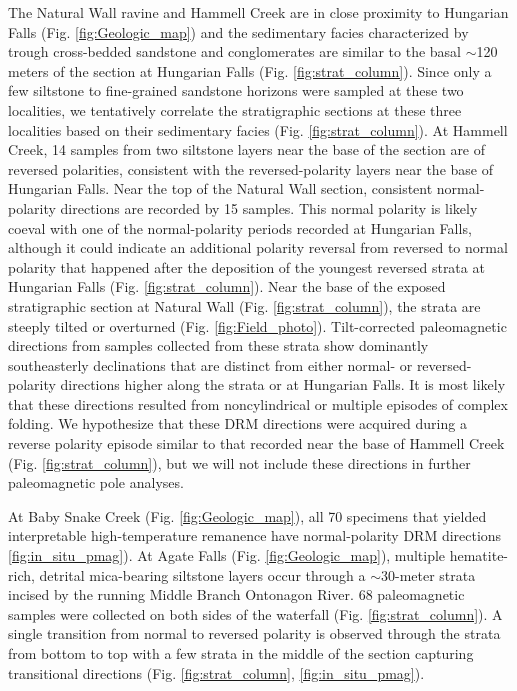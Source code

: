 \documentclass[draft]{agujournal2019}
\begin{document}
The Natural Wall ravine and Hammell Creek are in close proximity to Hungarian Falls (Fig. \ref{fig:Geologic_map}) and the sedimentary facies characterized by trough cross-bedded sandstone and conglomerates are similar to the basal $\sim$120 meters of the section at Hungarian Falls (Fig. \ref{fig:strat_column}). Since only a few siltstone to fine-grained sandstone horizons were sampled at these two localities, we tentatively correlate the stratigraphic sections at these three localities based on their sedimentary facies (Fig. \ref{fig:strat_column}). At Hammell Creek, 14 samples from two siltstone layers near the base of the section are of reversed polarities, consistent with the reversed-polarity layers near the base of Hungarian Falls. Near the top of the Natural Wall section, consistent normal-polarity directions are recorded by 15 samples. This normal polarity is likely coeval with one of the normal-polarity periods recorded at Hungarian Falls, although it could indicate an additional polarity reversal from reversed to normal polarity that happened after the deposition of the youngest reversed strata at Hungarian Falls (Fig. \ref{fig:strat_column}). Near the base of the exposed stratigraphic section at Natural Wall (Fig. \ref{fig:strat_column}), the strata are steeply tilted or overturned (Fig. \ref{fig:Field_photo}). Tilt-corrected paleomagnetic directions from samples collected from these strata show dominantly southeasterly declinations that are distinct from either normal- or reversed-polarity directions higher along the strata or at Hungarian Falls. It is most likely that these directions resulted from noncylindrical or multiple episodes of complex folding. We hypothesize that these DRM directions were acquired during a reverse polarity episode similar to that recorded near the base of Hammell Creek (Fig. \ref{fig:strat_column}), but we will not include these directions in further paleomagnetic pole analyses. 

At Baby Snake Creek (Fig. \ref{fig:Geologic_map}), all 70 specimens that yielded interpretable high-temperature remanence have normal-polarity DRM directions \ref{fig:in_situ_pmag}). At Agate Falls (Fig. \ref{fig:Geologic_map}), multiple hematite-rich, detrital mica-bearing siltstone layers occur through a $\sim$30-meter strata incised by the running Middle Branch Ontonagon River. 68 paleomagnetic samples were collected on both sides of the waterfall (Fig. \ref{fig:strat_column}). A single transition from normal to reversed polarity is observed through the strata from bottom to top with a few strata in the middle of the section capturing transitional directions (Fig. \ref{fig:strat_column}, \ref{fig:in_situ_pmag}). 
\end{document}
